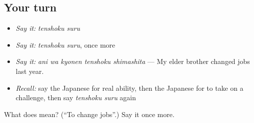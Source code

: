 \subsection*{Your turn}
\begin{itemize}
\raggedright
  \item \emph{Say it:} \emph{tenshoku suru}
  \item \emph{Say it:} \emph{tenshoku suru}, once more
  \item \emph{Say it:} \emph{ani wa kyonen tenshoku shimashita} — My elder brother changed jobs last year.
  \item \emph{Recall:} say the Japanese for real ability, then the Japanese for to take on a challenge, then say \emph{tenshoku suru} again
\end{itemize}

\begin{tcolorbox}[breakable,colback=teal!4,colframe=teal!35!black,title={Before you move on}]
What does  mean? (\textquotedblleft{}To change jobs\textquotedblright{}.) Say it once more.
\end{tcolorbox}
